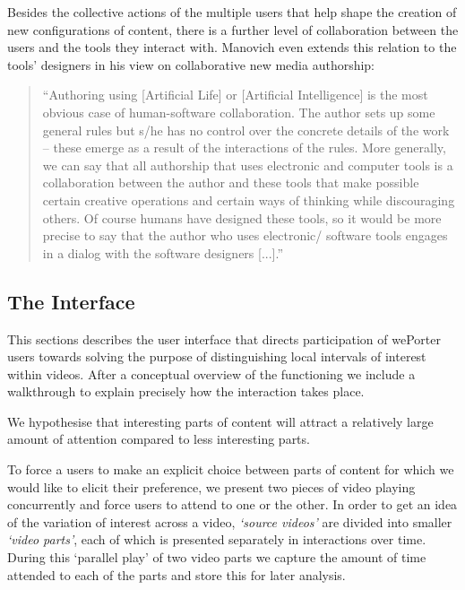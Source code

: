 Besides the collective actions of the multiple users that help shape the creation of new configurations of content, there is a further level of collaboration between the users and the tools they interact with. Manovich even extends this relation to the tools' designers in his view on collaborative new media authorship:

\begin{quote}
  ``Authoring using [Artificial Life] or [Artificial Intelligence] is the most obvious case of human-software collaboration. The author sets up some general rules but s/he has no control over the concrete details of the work – these emerge as a result of the interactions of the rules. More generally, we can say that all authorship that uses electronic and computer tools is a collaboration between the author and these tools that make possible certain creative operations and certain ways of thinking while discouraging others. Of course humans have designed these tools, so it would be more precise to say that the author who uses electronic/ software tools engages in a dialog with the software designers [...].''\cite{manovichAuthor}
\end{quote}


\subsection{The Interface}
\label{sec:weporter_interface} 
This sections describes the user interface that directs participation of wePorter users towards solving the purpose of distinguishing local intervals of interest within videos. After a conceptual overview of the functioning we include a walkthrough to explain precisely how the interaction takes place.

We hypothesise that interesting parts of content will attract a relatively large amount of attention compared to less interesting parts. 

To force a users to make an explicit choice between parts of content for which we would like to elicit their preference, we present two pieces of video playing concurrently and force users to attend to one or the other. In order to get an idea of the variation of interest across a video, \emph{`source videos'} are divided into smaller \emph{`video parts'}, each of which is presented separately in interactions over time. During this `parallel play' of two video parts we capture the amount of time attended to each of the parts and store this for later analysis. 

